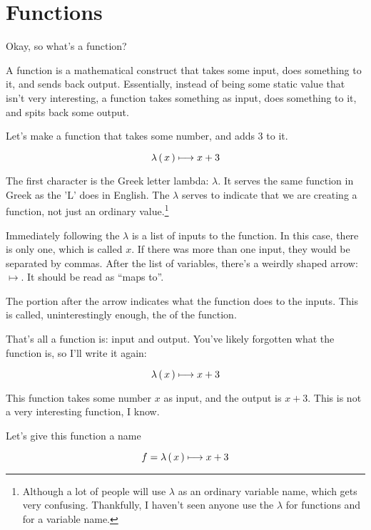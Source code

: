 \section{Functions}

Okay, so what's a function?

A function is a mathematical construct that takes some input, does something to
it, and sends back output. Essentially, instead of being some static value that
isn't very interesting, a function takes something as input, does something to
it, and spits back some output.

Let's make a function that takes some number, and adds 3 to it.

\begin{equation}
    \lambda \left(\, x \,\right) \longmapsto x + 3
\end{equation}


The first character is the Greek letter lambda: $\lambda$. It serves the same
function in Greek as the 'L' does in English. The $\lambda$ serves to indicate
that we are creating a function, not just an ordinary value.\footnote{Although a
  lot of people will use $\lambda$ as an ordinary variable name, which gets very
  confusing. Thankfully, I haven't seen anyone use  the $\lambda$ for
  functions and for a variable name.}

Immediately following the $\lambda$ is a list of inputs to the function. In this
case, there is only one, which is called $x$. If there was more than one input,
they would be separated by commas. After the list of variables, there's a
weirdly shaped arrow: $\mapsto$. It should be read as ``maps to''.

The portion after the arrow indicates what the function does to the inputs. This
is called, uninterestingly enough, the  of the function.

That's all a function is: input and output. You've likely forgotten what the
function is, so I'll write it again:

\begin{equation}
    \lambda \left(\, x \,\right) \longmapsto x + 3
\end{equation}

This function takes some number $x$ as input, and the output is $x + 3$. This is
not a very interesting function, I know.

Let's give this function a name

\begin{equation}
    f = \lambda \left(\, x \,\right) \longmapsto x + 3
\end{equation}

